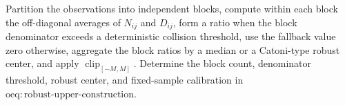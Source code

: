 Partition the observations into independent blocks, compute within each block the off-diagonal averages of \(N_{ij}\) and \(D_{ij}\), form a ratio when the block denominator exceeds a deterministic collision threshold, use the fallback value zero otherwise, aggregate the block ratios by a median or a Catoni-type robust center, and apply \(\operatorname{clip}_{[-M,M]}\). Determine the block count, denominator threshold, robust center, and fixed-sample calibration in \(\mathrm{oeq:robust\text{-}upper\text{-}construction}\).